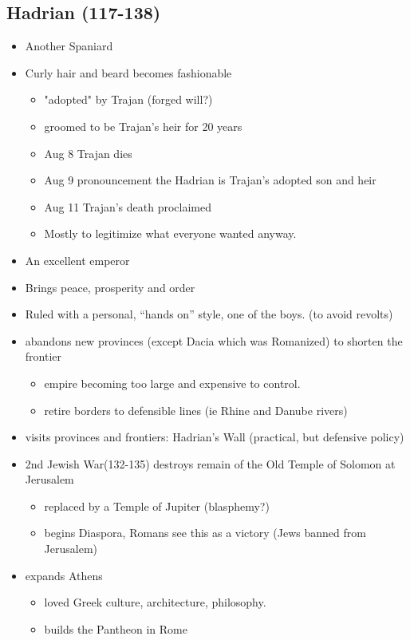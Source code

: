 \documentclass[12pt, twoside]{article}
\begin{document}
\subsection{Hadrian (117-138)}
\begin{itemize}
\item Another Spaniard
\item Curly hair and beard becomes fashionable
	\begin{itemize}
	\item "adopted" by Trajan (forged will?)
	\item groomed to be Trajan’s heir for 20 years
	\item Aug 8 Trajan dies
	\item Aug 9 pronouncement the Hadrian is Trajan’s adopted son and heir
	\item Aug 11 Trajan’s death proclaimed 
	\item  Mostly to legitimize what everyone wanted anyway.
	\end{itemize}
\item An excellent emperor
\item Brings peace, prosperity and order
\item Ruled with a personal, “hands on” style, one of the boys. (to avoid revolts)
\item abandons new provinces (except Dacia which was Romanized) to shorten the frontier
	\begin{itemize}
	\item empire becoming too large and expensive to control.
	\item retire borders to defensible  lines (ie Rhine and Danube rivers)
	\end{itemize}
\item visits provinces and frontiers: Hadrian's Wall (practical, but defensive policy)
\item 2nd Jewish War(132-135) destroys remain of the Old Temple of Solomon at Jerusalem
	\begin{itemize}
	\item replaced by a Temple of Jupiter (blasphemy?)
	\item begins Diaspora, Romans see this as a victory (Jews banned from Jerusalem)
	\end{itemize}
\item expands Athens
	\begin{itemize}
	\item loved Greek culture, architecture, philosophy.
	\item builds the Pantheon in Rome

\end{itemize}
\end{itemize}
\end{document}
